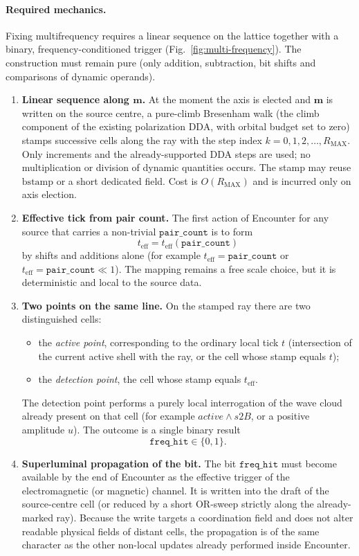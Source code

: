 \documentclass{ijuc}
\begin{document}
\paragraph{Required mechanics.}
Fixing multifrequency requires a linear sequence on the lattice together with a binary, frequency-conditioned trigger (Fig.~\ref{fig:multi-frequency}). The construction must remain pure (only addition, subtraction, bit shifts and comparisons of dynamic operands).

\begin{enumerate}
\item \textbf{Linear sequence along $\boldsymbol{m}$.}
  At the moment the axis is elected and $\boldsymbol{m}$ is written on the source centre, a pure-climb Bresenham walk (the climb component of the existing polarization DDA, with orbital budget set to zero) stamps successive cells along the ray with the step index $k=0,1,2,\dots,R_{\mathrm{MAX}}$. Only increments and the already-supported DDA steps are used; no multiplication or division of dynamic quantities occurs. The stamp may reuse $\mathrm{bstamp}$ or a short dedicated field. Cost is $O(R_{\mathrm{MAX}})$ and is incurred only on axis election.

\item \textbf{Effective tick from pair count.}
  The first action of Encounter for any source that carries a non-trivial $\texttt{pair\_count}$ is to form
  \[
  t_{\mathrm{eff}}=t_{\mathrm{eff}}(\texttt{pair\_count})
  \]
  by shifts and additions alone (for example $t_{\mathrm{eff}}=\texttt{pair\_count}$ or $t_{\mathrm{eff}}=\texttt{pair\_count}\ll 1$). The mapping remains a free scale choice, but it is deterministic and local to the source data.

\item \textbf{Two points on the same line.}
  On the stamped ray there are two distinguished cells:
  \begin{itemize}
  \item the \emph{active point}, corresponding to the ordinary local tick $t$ (intersection of the current active shell with the ray, or the cell whose stamp equals $t$);
  \item the \emph{detection point}, the cell whose stamp equals $t_{\mathrm{eff}}$.
  \end{itemize}
  The detection point performs a purely local interrogation of the wave cloud already present on that cell (for example $\mathit{active}\land s2B$, or a positive amplitude $u$). The outcome is a single binary result
  \[
  \texttt{freq\_hit}\in\{0,1\}.
  \]

\item \textbf{Superluminal propagation of the bit.}
  The bit $\texttt{freq\_hit}$ must become available by the end of Encounter as the effective trigger of the electromagnetic (or magnetic) channel. It is written into the draft of the source-centre cell (or reduced by a short OR-sweep strictly along the already-marked ray). Because the write targets a coordination field and does not alter readable physical fields of distant cells, the propagation is of the same character as the other non-local updates already performed inside Encounter.
\end{enumerate}
\end{document}

